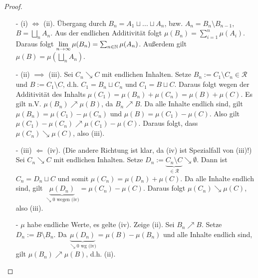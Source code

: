 \begin{proposition}
\begin{proof}
\begin{enumerate}[(\roman*),topsep=5pt, itemsep = 0 pt]
	\item[-] (i) $\iff$ (ii). Übergang durch $B_n = A_1 \sqcup ... \sqcup A_n$, bzw. $A_n = B_n \setminus B_{n-1}$, $B = \bigsqcup_n A_n$. Aus der endlichen Additivität folgt $\mu (B_n) = \sum_{i=1}^n \mu(A_i)$. Daraus folgt $\lim\limits_{n \to \infty} \mu (B_n) = \sum_{n \in \mathbb{N}} \mu (A_n)$. Außerdem gilt $\mu(B) = \mu (\bigsqcup_n A_n)$. \checkmark
	\item[-] (ii) $\implies$ (iii). Sei $C_n \searrow C$ mit endlichen Inhalten. Setze $B_n := C_1 \setminus C_n \in \mathcal{R}$ und $B := C_1 \setminus C$, d.h. $C_1 = B_n \sqcup C_n$ und $C_1 = B \sqcup C$. Daraus folgt wegen der Additivität des Inhalts $\mu(C_1) = \mu (B_n) + \mu(C_n)=\mu(B) + \mu (C)$. Es gilt n.V. $\mu(B_n) \nearrow \mu (B)$, da $B_n \nearrow B$. Da alle Inhalte endlich sind, gilt
		$\mu (B_n) = \mu(C_1) - \mu (C_n)$ und
		$\mu (B) = \mu(C_1) - \mu (C)$. Also gilt $\mu(C_1) - \mu (C_n) \nearrow \mu(C_1) - \mu (C)$.
	Daraus folgt, dass $\mu(C_n) \searrow \mu(C)$, also (iii).
	\item[-] (iii) $\Longleftarrow$ (iv).  (Die andere Richtung ist klar, da (iv) ist Spezialfall von (iii)!) \newline
	Sei $C_n \searrow C$ mit endlichen Inhalten. Setze $D_n := \underbrace{C_n \setminus C}_{\in \mathcal{R}} \searrow \emptyset$. Dann ist $C_n = D_n \sqcup C$ und somit $\mu(C_n) = \mu(D_n) + \mu(C)$. Da alle Inhalte endlich sind, gilt $\underbrace{\mu(D_n)}_{\searrow 0 \text{ wegen (iv)}} = \mu(C_n) -\mu (C)$. Daraus folgt $\mu(C_n) \searrow \mu (C)$, also (iii).
	\item[-] $\mu$ habe endliche Werte, es gelte (iv). Zeige (ii). Sei $B_n \nearrow B$. Setze $D_n:=B \setminus B_n$. Da $\underbrace{\mu(D_n)}_{\searrow 0 \text{ wg (iv)}} = \mu(B) - \mu (B_n)$ und alle Inhalte endlich sind, gilt $\mu(B_n) \nearrow \mu(B)$, d.h. (ii).
\end{enumerate}
\end{proof}
\end{proposition}



